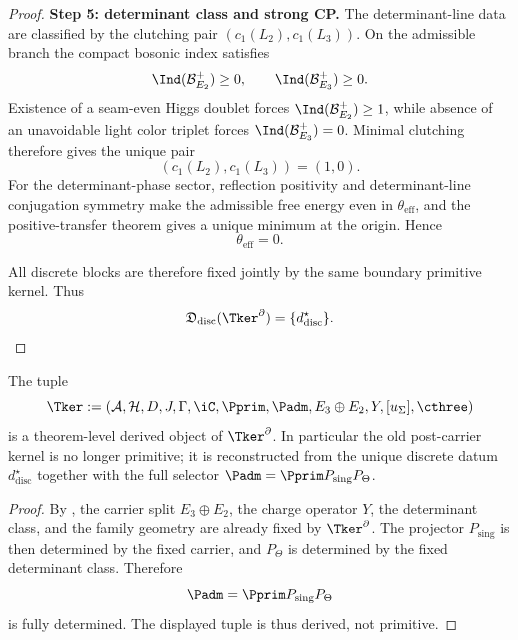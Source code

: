 \begin{proof}
\textbf{Step 5: determinant class and strong CP.}
The determinant-line data are classified by the clutching pair $(c_1(L_2),c_1(L_3))$. On the
admissible branch the compact bosonic index satisfies
\[
\Ind(\mathcal B_{E_2}^+)\ge 0,
\qquad
\Ind(\mathcal B_{E_3}^+)\ge 0.
\]
Existence of a seam-even Higgs doublet forces $\Ind(\mathcal B_{E_2}^+)\ge 1$, while absence of an
unavoidable light color triplet forces $\Ind(\mathcal B_{E_3}^+)=0$. Minimal clutching therefore
gives the unique pair
\[
(c_1(L_2),c_1(L_3))=(1,0).
\]
For the determinant-phase sector, reflection positivity and determinant-line conjugation symmetry
make the admissible free energy even in $\theta_{\mathrm{eff}}$, and the positive-transfer theorem
gives a unique minimum at the origin. Hence
\[
\theta_{\mathrm{eff}}=0.
\]

All discrete blocks are therefore fixed jointly by the same boundary primitive kernel. Thus
\[
\mathfrak D_{\mathrm{disc}}(\Tker^\partial)=\{d^\star_{\mathrm{disc}}\}.
\]
\end{proof}

\begin{corollary}
\label{cor:derived-post-carrier-kernel}
The tuple
\[
\Tker
:=
(\mathcal A,\mathcal H,D,J,\Gamma,\iC,\Pprim,\Padm,E_3\oplus E_2,Y,[u_\Sigma],\cthree)
\]
is a theorem-level derived object of $\Tker^\partial$. In particular the old post-carrier kernel is
no longer primitive; it is reconstructed from the unique discrete datum $d^\star_{\mathrm{disc}}$
together with the full selector $\Padm=\Pprim P_{\mathrm{sing}}P_\Theta$.
\end{corollary}

\begin{proof}
By , the carrier split $E_3\oplus E_2$, the charge
operator $Y$, the determinant class, and the family geometry are already fixed by
$\Tker^\partial$. The projector $P_{\mathrm{sing}}$ is then determined by the fixed carrier, and
$P_\Theta$ is determined by the fixed determinant class. Therefore
\[
\Padm=\Pprim P_{\mathrm{sing}}P_\Theta
\]
is fully determined. The displayed tuple is thus derived, not primitive.
\end{proof}

